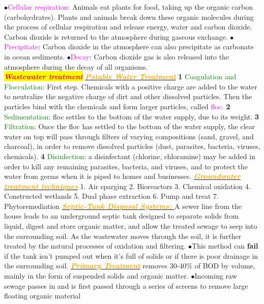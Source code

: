 \documentclass{article}
\newcommand{\ddd}{$\bullet$}
\newcommand{\red}[1]{\textcolor{red}{#1}}
\newcommand{\green}[1]{\textcolor{green}{#1}}
\newcommand{\pink}[1]{\textcolor{magenta}{#1}}
\newcommand{\orange}[1]{\textcolor{orange}{#1}}
\newcommand{\mysection}[1]{\colorbox{yellow}{\textbf{\textit{\red{#1}}}}}
\newcommand{\mysubsection}[1]{\underline{\textbf{{\textit{\orange{#1}}}}}}
\newcommand{\mysubsub}[1]{{{\green{#1}}}}
\newcommand{\vocab}[1]{{\pink{#1}}}
\begin{document}
\begin{multicols*}{4}
			\ddd \vocab{Cellular respiration}: Animals eat plants for food, taking up the organic carbon (carbohydrates). Plants and animals break down these organic molecules during the process of cellular respiration and release energy, water and carbon dioxide. Carbon dioxide is returned to the atmosphere during gaseous exchange. 
			\ddd \vocab{Precipitate}: Carbon dioxide in the atmosphere can also precipitate as carbonate in ocean sediments.
			\ddd \vocab{Decay}: Carbon dioxide gas is also released into the atmosphere during the decay of all organisms.	
	\\
   	\mysection{Wastewater treatment}
    	\mysubsection{Potable Water Treatment}
    		\textbf{1} \mysubsub{Coagulation and Flocculation}: First step. Chemicals with a positive charge are added to the water to neutralize the negative charge of dirt and other dissolved particles. Then the particles bind with the chemicals and form larger particles, called \pink{floc}.
    		\textbf{2} \mysubsub{Sedimentation}: floc settles to the bottom of the water supply, due to its weight.
    		\textbf{3} \mysubsub{Filtration}: Once the floc has settled to the bottom of the water supply, the clear water on top will pass through filters of varying compositions (sand, gravel, and charcoal), in order to remove dissolved particles (dust, parasites, bacteria, viruses, chemicals).
    		\textbf{4} \mysubsub{Disinfection}: a disinfectant (chlorine, chloramine) may be added in order to kill any remaining parasites, bacteria, and viruses, and to protect the water from germs when it is piped to homes and businesses.
        \mysubsection{Groundwater treatment techniques}
             1. Air sparging 2. Bioreactors 3. Chemical oxidation 4. Constructed wetlands 5. Dual phase extraction 6. Pump and treat 7. Phytoremediation
        \mysubsection{Septic-Tank Disposal Systems: }
            A sewer line from the house leads to an underground septic tank designed to separate solids from liquid, digest and store organic matter, and allow the treated sewage to seep into the surrounding soil. As the wastewater moves through the soil, it is further treated by the natural processes of oxidation and filtering.
            \ddd This method can \textbf{fail} if the tank isn't pumped out when it's full of solids or if there is poor drainage in the surrounding soil.
        \mysubsection{Primary Treatment} 
            removes 30-40\% of BOD by volume, mainly in the form of suspended solids and organic matter. 
            \ddd Incoming raw sewage passes in and is first passed through a series of screens to remove large floating organic material

\end{multicols*}
\end{document}
